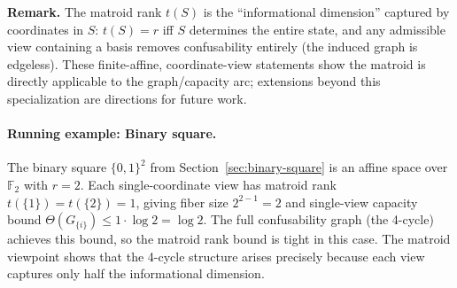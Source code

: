 \noindent\textbf{Remark.} The matroid rank $t(S)$ is the ``informational dimension'' captured by coordinates in $S$: $t(S)=r$ iff $S$ determines the entire state, and any admissible view containing a basis removes confusability entirely (the induced graph is edgeless). These finite-affine, coordinate-view statements show the matroid is directly applicable to the graph/capacity arc; extensions beyond this specialization are directions for future work.

\paragraph{Running example: Binary square.}
The binary square $\{0,1\}^2$ from Section~\ref{sec:binary-square} is an affine space over $\mathbb{F}_2$ with $r=2$. Each single-coordinate view has matroid rank $t(\{1\}) = t(\{2\}) = 1$, giving fiber size $2^{2-1} = 2$ and single-view capacity bound $\Theta(G_{\{i\}}) \le 1 \cdot \log 2 = \log 2$. The full confusability graph (the 4-cycle) achieves this bound, so the matroid rank bound is tight in this case. The matroid viewpoint shows that the 4-cycle structure arises precisely because each view captures only half the informational dimension.
